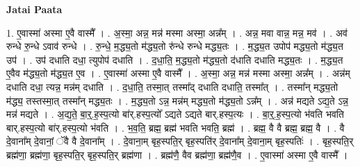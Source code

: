 \documentclass[17pt]{extarticle}
\begin{document}
\textbf{Jatai Paata} \newline

1. ए॒वास्मा॑ अस्मा ए॒वै वास्मै᳚ । . अ॒स्मा॒ अन्न॒ मन्न॑ मस्मा अस्मा॒ अन्न᳚म् । . अन्न॒ मवा वान्न॒ मन्न॒ मव॑ । . अव॑ रुन्धे रु॒न्धे ऽवाव॑ रुन्धे । . रु॒न्धे॒ म॒द्ध्य॒तो म॑द्ध्य॒तो रु॑न्धे रुन्धे मद्ध्य॒तः । . म॒द्ध्य॒त उपोप॑ मद्ध्य॒तो म॑द्ध्य॒त उप॑ । . उप॑ दधाति दधा॒ त्युपोप॑ दधाति । . द॒धा॒ति॒ म॒द्ध्य॒तो म॑द्ध्य॒तो द॑धाति दधाति मद्ध्य॒तः । . म॒द्ध्य॒त ए॒वैव म॑द्ध्य॒तो म॑द्ध्य॒त ए॒व । . ए॒वास्मा॑ अस्मा ए॒वै वास्मै᳚ । . अ॒स्मा॒ अन्न॒ मन्न॑ मस्मा अस्मा॒ अन्न᳚म् । . अन्न॑म् दधाति दधा॒ त्यन्न॒ मन्न॑म् दधाति । . द॒धा॒ति॒ तस्मा॒त् तस्मा᳚द् दधाति दधाति॒ तस्मा᳚त् । . तस्मा᳚न् मद्ध्य॒तो म॑द्ध्य॒ तस्तस्मा॒त् तस्मा᳚न् मद्ध्य॒तः । . म॒द्ध्य॒तो ऽन्न॒ मन्न॑म् मद्ध्य॒तो म॑द्ध्य॒तो ऽन्न᳚म् । . अन्न॑ मद्यते ऽद्य॒ते ऽन्न॒ मन्न॑ मद्यते । . अ॒द्य॒ते॒ बा॒र्॒.ह॒स्प॒त्यो बा॑र्.हस्प॒त्यो᳚ ऽद्यते ऽद्यते बार्.हस्प॒त्यः । . बा॒र्॒.ह॒स्प॒त्यो भ॑वति भवति बार्.हस्प॒त्यो बा॑र्.हस्प॒त्यो भ॑वति । . भ॒व॒ति॒ ब्रह्म॒ ब्रह्म॑ भवति भवति॒ ब्रह्म॑ । . ब्रह्म॒ वै वै ब्रह्म॒ ब्रह्म॒ वै । . वै दे॒वाना᳚म् दे॒वानां॒ ॅवै वै दे॒वाना᳚म् । . दे॒वाना॒म् बृह॒स्पति॒र् बृह॒स्पति॑र् दे॒वाना᳚म् दे॒वाना॒म् बृह॒स्पतिः॑ । . बृह॒स्पति॒र् ब्रह्म॑णा॒ ब्रह्म॑णा॒ बृह॒स्पति॒र् बृह॒स्पति॒र् ब्रह्म॑णा । . ब्रह्म॑णै॒ वैव ब्रह्म॑णा॒ ब्रह्म॑णै॒व । . ए॒वास्मा॑ अस्मा ए॒वै वास्मै᳚ । \newline
\end{document}
